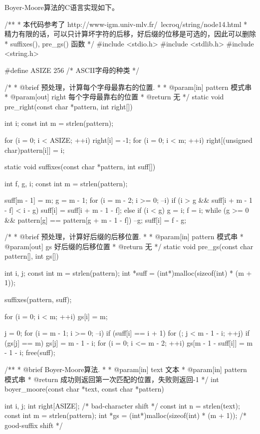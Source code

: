 Boyer-Moore算法的C语言实现如下。
\begin{Codex}[label=boyer_moore.c]
/**
 * 本代码参考了 http://www-igm.univ-mlv.fr/~lecroq/string/node14.html
 * 精力有限的话，可以只计算坏字符的后移，好后缀的位移是可选的，因此可以删除
 * suffixes(), pre_gs() 函数
 */
#include <stdio.h>
#include <stdlib.h>
#include <string.h>

#define ASIZE 256  /* ASCII字母的种类 */

/*
 * @brief 预处理，计算每个字母最靠右的位置.
 *
 * @param[in] pattern 模式串
 * @param[out] right 每个字母最靠右的位置
 * @return 无
 */
static void pre_right(const char *pattern, int right[]) {
    int i;
    const int m = strlen(pattern);

    for (i = 0; i < ASIZE; ++i) right[i] = -1;
    for (i = 0; i < m; ++i) right[(unsigned char)pattern[i]] = i;
}


static void suffixes(const char *pattern, int suff[]) {
    int f, g, i;
    const int m = strlen(pattern);

    suff[m - 1] = m;
    g = m - 1;
    for (i = m - 2; i >= 0; --i) {
        if (i > g && suff[i + m - 1 - f] < i - g)
            suff[i] = suff[i + m - 1 - f];
        else {
            if (i < g)
                g = i;
            f = i;
            while (g >= 0 && pattern[g] == pattern[g + m - 1 - f])
                --g;
            suff[i] = f - g;
        }
    }
}

/*
 * @brief 预处理，计算好后缀的后移位置.
 *
 * @param[in] pattern 模式串
 * @param[out] gs 好后缀的后移位置
 * @return 无
 */
static void pre_gs(const char pattern[], int gs[]) {
    int i, j;
    const int m = strlen(pattern);
    int *suff = (int*)malloc(sizeof(int) * (m + 1));

    suffixes(pattern, suff);

    for (i = 0; i < m; ++i) gs[i] = m;

    j = 0;
    for (i = m - 1; i >= 0; --i) if (suff[i] == i + 1)
        for (; j < m - 1 - i; ++j) if (gs[j] == m)
            gs[j] = m - 1 - i;
    for (i = 0; i <= m - 2; ++i)
        gs[m - 1 - suff[i]] = m - 1 - i;
    free(suff);
}

/**
 * @brief Boyer-Moore算法.
 *
 * @param[in] text 文本
 * @param[in] pattern 模式串
 * @return 成功则返回第一次匹配的位置，失败则返回-1
 */
int boyer_moore(const char *text, const char *pattern) {
    int i, j;
    int right[ASIZE];  /* bad-character shift */
    const int n = strlen(text);
    const int m = strlen(pattern);
    int *gs = (int*)malloc(sizeof(int) * (m + 1));  /* good-suffix shift */

}
\end{Codex}
